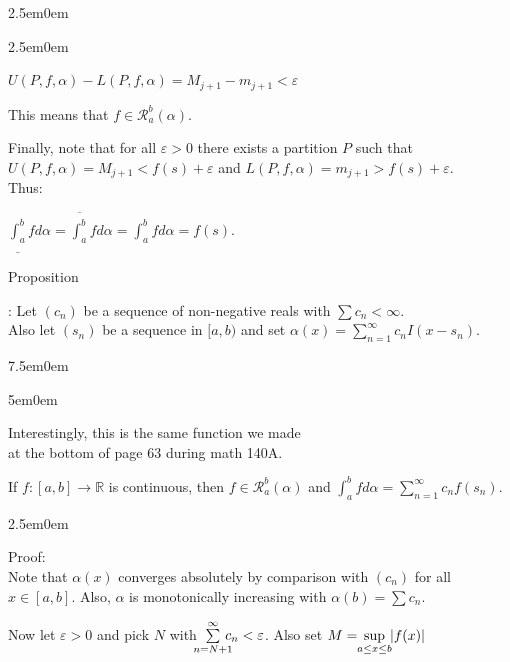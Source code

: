 \documentclass{book}
\newcommand{\hThree}{%
   \color{PineGreen!85!Orange}
   \fontsize{13}{15}\selectfont%
}
\newcommand{\hFour}{%
   \color{Cerulean}
   \fontsize{12}{14}\selectfont%
}
\newenvironment{myIndent}{%
   \begin{adjustwidth}{2.5em}{0em}%
}{%
   \end{adjustwidth}%
}
\newenvironment{myDindent}{%
   \begin{adjustwidth}{5em}{0em}%
}{%
   \end{adjustwidth}%
}
\newenvironment{myTindent}{%
   \begin{adjustwidth}{7.5em}{0em}%
}{%
   \end{adjustwidth}%
}
\newcounter{PropNumber}
\newcommand{\propCount}[1][1]{%
   \addtocounter{PropNumber}{#1}%
   \thePropNumber%
}
\newcommand{\retTwo}{\hfill\bigbreak}
\begin{document}
{\begin{myIndent}
{\begin{myIndent}
      {\centering $U(P, f, \alpha) - L(P, f, \alpha) = M_{j+1} - m_{j+1} < \varepsilon$ \retTwo\par}

      This means that $f \in \mathscr{R}_a^b(\alpha)$.\retTwo

      Finally, note that for all $\varepsilon > 0$ there exists a partition $P$ such that\\ $U(P, f, \alpha) = M_{j+1} < f(s) + \varepsilon$ and $L(P, f, \alpha) = m_{j+1} > f(s) + \varepsilon$.\\ Thus:

      {\centering $\underline{\int_a^b}fd\alpha = \overline{\int_a^b}fd\alpha = \int_a^bfd\alpha = f(s)$.\retTwo\par}
   \end{myIndent}}

   \newpage

   Proposition \propCount: Let $(c_n)$ be a sequence of non-negative reals with $\sum c_n < \infty$.\\ Also let $(s_n)$ be a sequence in $[a, b)$ and set $\alpha(x) = \sum\limits_{n=1}^\infty c_nI(x - s_n)$.

   {\begin{myTindent}\begin{myDindent}\hFour
      Interestingly, this is the same function we made\\ at the bottom of page 63 during math 140A.\retTwo
   \end{myDindent}\end{myTindent}}

   If $f: [a, b] \longrightarrow \mathbb{R}$ is continuous, then $f \in \mathscr{R}_a^b(\alpha)$  and $\int_a^bfd\alpha = \sum\limits_{n=1}^\infty c_nf(s_n)$.\\ [ -6pt]

   
   {\begin{myIndent}\hThree
      Proof:\\
      Note that $\alpha(x)$ converges absolutely by comparison with $(c_n)$ for all\\ [1pt] $x \in [a, b]$. Also, $\alpha$ is monotonically increasing with $\alpha(b) = \sum c_n$.\retTwo

      Now let $\varepsilon > 0$ and pick $N$ with $\hspace{-0.65em}\sum\limits_{n = N+1}^\infty\hspace{-0.7em} c_n < \varepsilon$. Also set $M = \hspace{-0.3em}\sup\limits_{a\leq x\leq b}\hspace{-0.3em}|f(x)|$\retTwo
      

\end{myIndent}}
\end{myIndent}}
\end{document}
